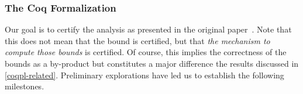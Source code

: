

\subsubsection{The Coq Formalization}

Our goal is to certify the analysis as presented in the original paper~\cite{jones2009}.
Note that this does not mean that the bound is certified, but that \emph{the mechanism to compute those bounds} is certified.
Of course, this implies the correctness of the bounds as a by-product but constitutes a major difference \wrt the results discussed in \autoref{coqpl-related}.
%
Preliminary explorations have led us to establish the following milestones.

